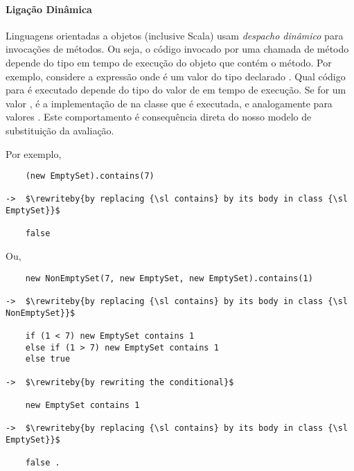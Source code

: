 \paragraph{Liga\c{c}\~{a}o Din\^{a}mica}
Linguagens orientadas a objetos (inclusive Scala) usam \emph{despacho din\^{a}mico} para 
invoca\c{c}\~{o}es de m\'{e}todos. Ou seja, o c\'{o}digo invocado por uma chamada de m\'{e}todo depende
do tipo em tempo de execu\c{c}\~{a}o do objeto que cont\'{e}m o m\'{e}todo. Por exemplo, considere
a express\~{a}o  onde  \'{e} um valor do tipo declarado . 
Qual c\'{o}digo para  \'{e} executado depende do tipo do valor de  em 
tempo de execu\c{c}\~{a}o. Se for um valor , \'{e} a implementa\c{c}\~{a}o de  na 
classe  que \'{e} executada, e analogamente para valores .
Este comportamento \'{e} consequ\^{e}ncia direta do nosso modelo de substitui\c{c}\~{a}o da avalia\c{c}\~{a}o.

Por exemplo, 
\begin{lstlisting}
    (new EmptySet).contains(7) 

->  $\rewriteby{by replacing {\sl contains} by its body in class {\sl EmptySet}}$

    false
\end{lstlisting}
Ou,
\begin{lstlisting}
    new NonEmptySet(7, new EmptySet, new EmptySet).contains(1)

->  $\rewriteby{by replacing {\sl contains} by its body in class {\sl NonEmptySet}}$

    if (1 < 7) new EmptySet contains 1
    else if (1 > 7) new EmptySet contains 1
    else true

->  $\rewriteby{by rewriting the conditional}$

    new EmptySet contains 1

->  $\rewriteby{by replacing {\sl contains} by its body in class {\sl EmptySet}}$

    false .
\end{lstlisting}

